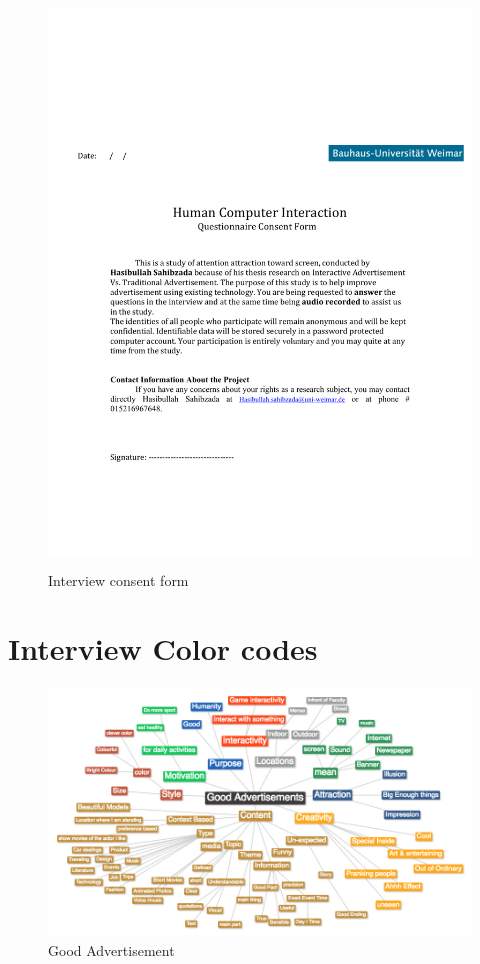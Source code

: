 \begin{appendices}
\begin{figure}[H]
 \centering 
    \includegraphics[width=\textwidth,height=150mm]{Appendices/3/Consent_form.pdf}
    \caption{Interview consent form}
     \label{app:concentform}%
\end{figure}

\section {Interview Color codes}

\begin{figure}[H]
 \centering 
    \includegraphics[width=\textwidth,height=0.4\textheight]{Appendices/3/good_ad.jpg}
    \caption{Good Advertisement}
     \label{app:goodadver}%
\end{figure}




\end{appendices}
